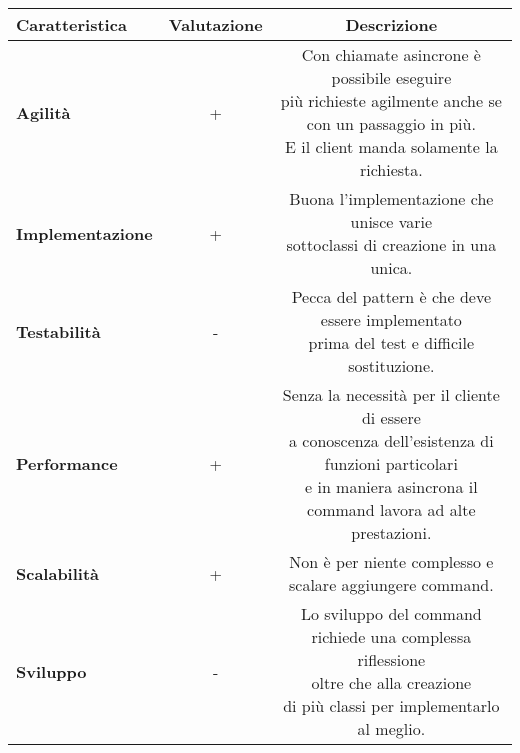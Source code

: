 {{{\begin{itemize}
				\small %
				{\renewcommand\arraystretch{1.2} %
					\begin{tabular}{|l|c|c|}
						\hline
						{\textbf{Caratteristica}}&{\textbf{Valutazione}}&{\textbf{Descrizione}}\\
						\hline
						\textbf{Agilità} & + &  \minitab[c]{Con chiamate asincrone è possibile eseguire\\più richieste agilmente anche se con un passaggio in più.\\E il client manda solamente la richiesta.} \\
						\hline
						\textbf{Implementazione} & + &  \minitab[c]{Buona l'implementazione che unisce varie\\sottoclassi di creazione in una unica.}\\
						\hline
						\textbf{Testabilità} & - &  \minitab[c]{Pecca del pattern è che deve essere implementato\\prima del test e difficile sostituzione.}\\
						\hline
						\textbf{Performance} & + &   \minitab[c]{Senza la necessità per il cliente di essere\\a conoscenza dell'esistenza di funzioni particolari\\e in maniera asincrona il command lavora ad alte prestazioni.} \\
						\hline
						\textbf{Scalabilità} & + &  Non è per niente complesso e scalare aggiungere command. \\
						\hline
						\textbf{Sviluppo} & - &  \minitab[c]{Lo sviluppo del command richiede una complessa riflessione\\ oltre che alla creazione\\di più classi per implementarlo al meglio.}\\
						\hline
					\end{tabular}
				}
			\end{itemize}
		}
	}
}